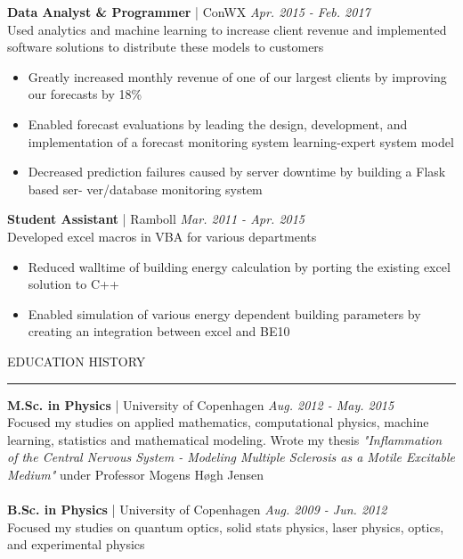 \documentclass[12pt,a4paper]{article}
\newcommand{\textline}[3]{\normalsize{\textbf{#1} | #2 \hfill \textit{#3}}}
\newcommand{\headline}[1]{\Large \textcolor{myblue}{#1}}
\begin{document}
\textline{Data Analyst \& Programmer}{ConWX}{Apr. 2015 - Feb. 2017}\\
Used analytics and machine learning to increase client revenue and implemented software solutions to distribute these models to customers
\begin{itemize}[label=\textcolor{myblue}{\textbullet}]
    \vspace{-0.3cm}
    \item Greatly increased monthly revenue of one of our largest clients by improving our forecasts by 18\%
    \vspace{-0.3cm}
    \item Enabled forecast evaluations by leading the design, development, and implementation of a forecast monitoring system
learning-expert system model
    \vspace{-0.3cm}
    \item Decreased prediction failures caused by server downtime by building a Flask based ser-
ver/database monitoring system
\end{itemize}

\textline{Student Assistant}{Ramboll}{Mar. 2011 - Apr. 2015}\\
Developed excel macros in VBA for various departments
\begin{itemize}[label=\textcolor{myblue}{\textbullet}]
    \vspace{-0.3cm}
    \item Reduced walltime of building energy calculation by porting the existing excel solution to C++
    \vspace{-0.3cm}
    \item Enabled simulation of various energy dependent building parameters by creating an integration between excel and BE10
\end{itemize}

{\headline{EDUCATION HISTORY}}
\vspace{0.2cm}
{\color{myblue}\hrule height 0.3mm}
\vspace{0.2cm}
\textline{\normalsize{M.Sc. in Physics}}{University of Copenhagen}{\normalsize{Aug. 2012 - May. 2015}}\\
Focused my studies on applied mathematics, computational physics, machine learning, statistics and mathematical modeling. Wrote my thesis \textit{"Inflammation of the Central Nervous System - Modeling Multiple Sclerosis as a Motile Excitable Medium"} under Professor Mogens Høgh Jensen\\
\\
\textline{\normalsize{B.Sc. in Physics}}{University of Copenhagen}{\normalsize{Aug. 2009 - Jun. 2012}}\\
Focused my studies on quantum optics, solid stats physics, laser physics, optics, and experimental physics\\
\end{document}
